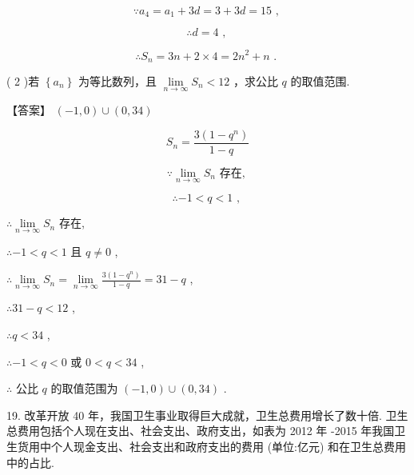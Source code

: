 \documentclass[10pt]{article}
\begin{document}
\[
\because {a}_{4} = {a}_{1} + {3d} = 3 + {3d} = {15}\text{ , }
\]

\[
\therefore d = 4\text{ , }
\]

\[
\therefore {S}_{n} = {3n} + 2 \times  4 = 2{n}^{2} + n\text{ . }
\]

( 2 )若 \(\left\{  {a}_{n}\right\}\) 为等比数列，且 \(\mathop{\lim }\limits_{{n \rightarrow  \infty }}{S}_{n} < {12}\) ，求公比 \(q\) 的取值范围.

【答案】 \(\left( {-1,0}\right)  \cup  \left( {0,{34}}\right)\)

\[
{S}_{n} = \frac{3\left( {1 - {q}^{n}}\right) }{1 - q}
\]

\[
\because \mathop{\lim }\limits_{{n \rightarrow  \infty }}{S}_{n}\text{ 存在, }
\]

\[
\therefore  - 1 < q < 1\text{ , }
\]

\(\therefore \mathop{\lim }\limits_{{n \rightarrow  \infty }}{S}_{n}\) 存在,

\(\therefore  - 1 < q < 1\) 且 \(q \neq  0\) ,

\(\therefore \mathop{\lim }\limits_{{n \rightarrow  \infty }}{S}_{n} = \mathop{\lim }\limits_{{n \rightarrow  \infty }}\frac{3\left( {1 - {q}^{n}}\right) }{1 - q} = {31} - q\) ,

\(\therefore {31} - q < {12}\) ,

\(\therefore q < {34}\) ,

\(\therefore  - 1 < q < 0\) 或 \(0 < q < {34}\) ,

\(\therefore\) 公比 \(q\) 的取值范围为 \(\left( {-1,0}\right)  \cup  \left( {0,{34}}\right)\) .

19. 改革开放 40 年，我国卫生事业取得巨大成就，卫生总费用增长了数十倍. 卫生总费用包括个人现在支出、社会支出、政府支出，如表为 2012 年 -2015 年我国卫生货用中个人现金支出、社会支出和政府支出的费用 (单位:亿元) 和在卫生总费用中的占比.
\end{document}
